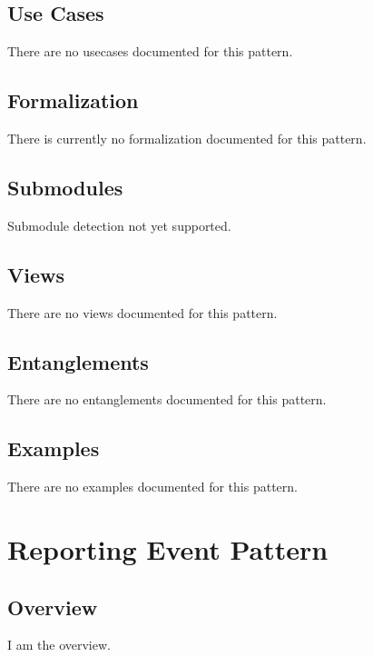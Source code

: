 \subsection{Use Cases}
\label{ssec:use-cases}
There are no usecases documented for this pattern.
\subsection{Formalization}
\label{ssec:formalization}
There is currently no formalization documented for this pattern.

\subsection{Submodules}
\label{ssec:submodules}
Submodule detection not yet supported.

\subsection{Views}
\label{ssec:views}
There are no views documented for this pattern.


\subsection{Entanglements}
\label{ssec:entanglements}
There are no entanglements documented for this pattern.

\subsection{Examples}
\label{ssec:examples}
There are no examples documented for this pattern.


\section{Reporting Event Pattern}
\label{sec:reporting-event-pattern}
\subsection{Overview}
\label{ssec:overview}
I am the overview.

